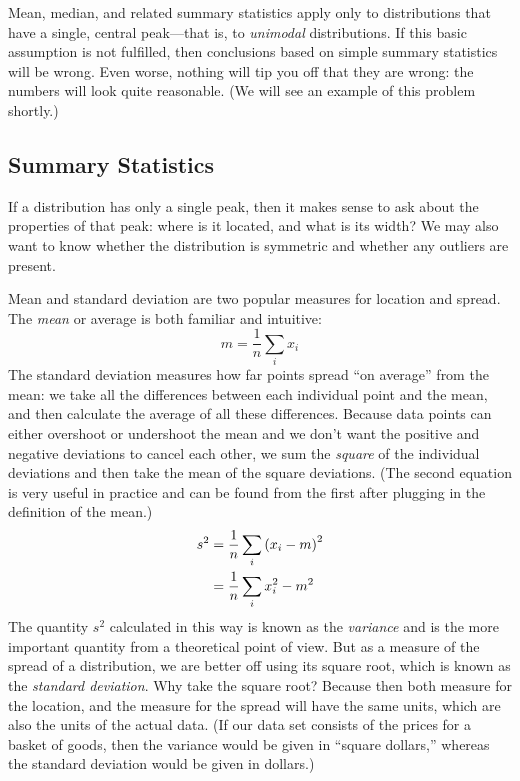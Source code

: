 Mean, median, and related summary statistics apply only to
distributions that have a single, central peak---that is, to
\emph{unimodal} distributions. If this basic assumption is not
fulfilled, then conclusions based on simple summary statistics will be
wrong. Even worse, nothing will tip you off that they are wrong: the
numbers will look quite reasonable. (We will see an example of this
problem shortly.)

\subsection{Summary Statistics}


If a distribution has only a single peak, then it makes sense to ask
about the properties of that peak: where is it located, and what is
its width? We may also want to know whether the distribution is
symmetric and whether any outliers are present.

Mean and standard deviation are two popular measures for location and
spread. The \emph{mean} or average is both familiar and intuitive:
%
\[
m = \frac{1}{n} \sum_i x_i
\]
%
The standard deviation measures how far points spread ``on average''
from the mean: we take all the differences between each individual
point and the mean, and then calculate the average of all these
differences. Because data points can either overshoot or undershoot
the mean and we don't\vadjust{\pagebreak} want the positive and negative deviations to
cancel each other, we sum the \emph{square} of the individual
deviations and then take the mean of the square deviations.  (The
second equation is very useful in practice and can be found from the
first after plugging in the definition of the mean.)
%
\begin{align*}
s^2 & = \frac{1}{n} \sum_i \left(  x_i - m  \right)^2 \\
    & = \frac{1}{n} \sum_i x_i^2 - m^2
\end{align*}
%
The quantity $s^2$ calculated in this way is known as the
\emph{variance} and is the more important quantity from a theoretical
point of view. But as a measure of the spread of a distribution, we are
better off using its square root, which is known as the \emph{standard
  deviation}. Why take the square root?  Because then both measure for
the location, and the measure for the spread will have the same units,
which are also the units of the actual data. (If our data set consists
of the prices for a basket of goods, then the variance would be given
in ``square dollars,'' whereas the standard deviation would be given
in dollars.)

